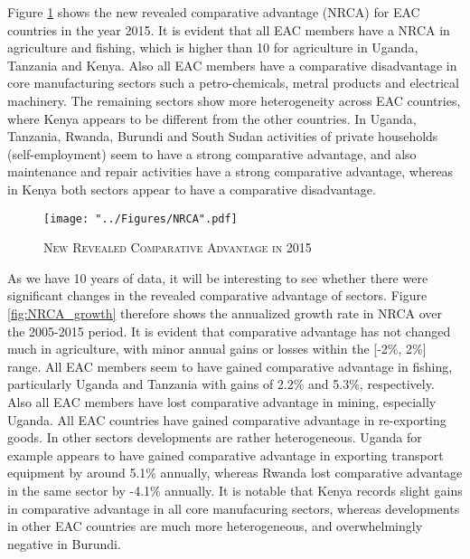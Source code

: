 \documentclass[a4paper]{article}
\begin{document}
Figure \ref{fig:NRCA} shows the new revealed comparative advantage (NRCA) for EAC countries in the year 2015. It is evident that all EAC members have a NRCA in agriculture and fishing, which is higher than 10 for agriculture in Uganda, Tanzania and Kenya. Also all EAC members have a comparative disadvantage in core manufacturing sectors such a petro-chemicals, metral products and electrical machinery. The remaining sectors show more heterogeneity across EAC countries, where Kenya appears to be different from the other countries. In Uganda, Tanzania, Rwanda, Burundi and South Sudan activities of private households (self-employment) seem to have a strong comparative advantage, and also maintenance and repair activities have a strong comparative advantage, whereas in Kenya both sectors appear to have a comparative disadvantage. \newline

\begin{figure}[h!]
\centering
\caption{\label{fig:NRCA}\textsc{New Revealed Comparative Advantage in 2015}}
\texttt{[image: "../Figures/NRCA".pdf]} %
\end{figure}
\FloatBarrier

As we have 10 years of data, it will be interesting to see whether there were significant changes in the revealed comparative advantage of sectors. Figure \ref{fig:NRCA_growth} therefore shows the annualized growth rate in NRCA over the 2005-2015 period. It is evident that comparative advantage has not changed much in agriculture, with minor annual gains or losses within the [-2\%, 2\%] range. All EAC members seem to have gained comparative advantage in fishing, particularly Uganda and Tanzania with gains of 2.2\% and 5.3\%, respectively. Also all EAC members have lost comparative advantage in mining, especially Uganda. All EAC countries have gained comparative advantage in re-exporting goods. In other sectors developments are rather heterogeneous. Uganda for example appears to have gained comparative advantage in exporting transport equipment by around 5.1\% annually, whereas Rwanda lost comparative advantage in the same sector by -4.1\% annually. It is notable that Kenya records slight gains in comparative advantage in all core manufacuring sectors, whereas developments in other EAC countries are much more heterogeneous, and overwhelmingly negative in Burundi.

\end{document}
